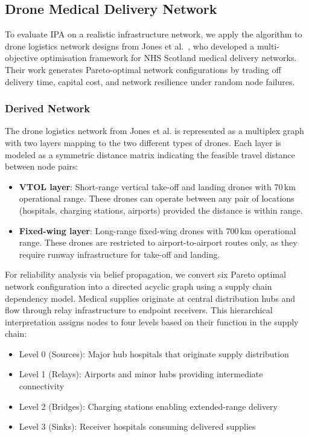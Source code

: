 
\subsection{Drone Medical Delivery Network}

To evaluate IPA on a realistic infrastructure network, we apply the algorithm to drone logistics network designs from Jones et al.~\cite{jones_drone_2025}, who developed a multi-objective optimisation framework for NHS Scotland medical delivery networks. Their work generates Pareto-optimal network configurations by trading off delivery time, capital cost, and network resilience under random node failures.

\subsubsection{Derived Network}
The drone logistics network from Jones et al. is represented as a multiplex graph with two layers mapping to the two different types of drones. Each layer is modeled as a symmetric distance matrix indicating the feasible travel distance between node pairs:

\begin{itemize}
    \item \textbf{VTOL layer}: Short-range vertical take-off and landing drones with 70\,km operational range. These drones can operate between any pair of locations (hospitals, charging stations, airports) provided the distance is within range.
    \item \textbf{Fixed-wing layer}: Long-range fixed-wing drones with 700\,km operational range. These drones are restricted to airport-to-airport routes only, as they require runway infrastructure for take-off and landing.
\end{itemize}

For reliability analysis via belief propagation, we convert six Pareto optimal network configuration into a directed acyclic graph using a supply chain dependency model. Medical supplies originate at central distribution hubs and flow through relay infrastructure to endpoint receivers. This hierarchical interpretation assigns nodes to four levels based on their function in the supply chain:

\begin{itemize}
    \item Level 0 (Sources): Major hub hospitals that originate supply distribution
    \item Level 1 (Relays): Airports and minor hubs providing intermediate connectivity
    \item Level 2 (Bridges): Charging stations enabling extended-range delivery
    \item Level 3 (Sinks): Receiver hospitals consuming delivered supplies
\end{itemize}

